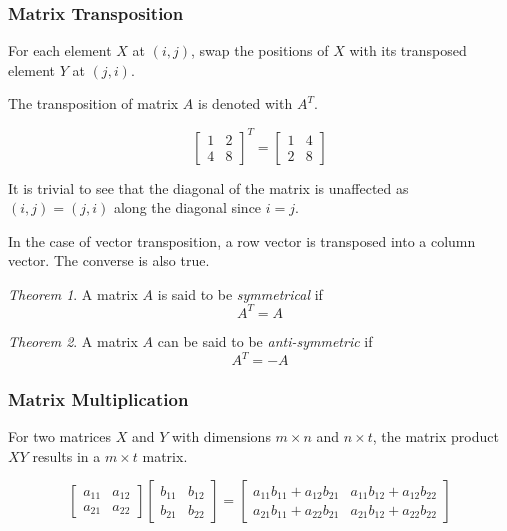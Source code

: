 \documentclass[a4paper]{article}
\theoremstyle{remark}
\theoremstyle{theorem}
\newtheorem{theorem}{Theorem}
\begin{document}
\subsubsection{Matrix Transposition}
For each element $X$ at $(i,j)$, swap the positions of $X$ with its transposed element $Y$ at $(j, i)$.

The transposition of matrix $A$ is denoted with $A^T$.

\begin{equation}
	\begin{bmatrix}
	1	& 2 \\
	4 	& 8
	\end{bmatrix}^{T}
	=
	\begin{bmatrix}
	1	& 4 \\
	2	& 8
	\end{bmatrix}
\end{equation}

It is trivial to see that the diagonal of the matrix is unaffected as $(i,j) = (j,i)$ along the diagonal since $i=j$.

In the case of vector transposition, a row vector is transposed into a column vector.
The converse is also true.

\begin{theorem}
	A matrix $A$ is said to be \emph{symmetrical} if
	\begin{equation}
		A^T = A
	\end{equation}
\end{theorem}

\begin{theorem}
	A matrix $A$ can be said to be \emph{anti-symmetric} if
	\begin{equation}
		A^T = -A
	\end{equation}
\end{theorem}

\subsubsection{Matrix Multiplication}
For two matrices $X$ and $Y$ with dimensions $m\times n$ and $n\times t$, the matrix product $XY$ results in a $m\times t$ matrix.

\begin{equation}
	\begin{bmatrix}
	a_{11} & a_{12} \\
	a_{21} & a_{22}
	\end{bmatrix}
	\begin{bmatrix}
	b_{11} & b_{12} \\
	b_{21} & b_{22}
	\end{bmatrix}
	=
	\begin{bmatrix}
	a_{11}b_{11} + a_{12}b_{21} & a_{11}b_{12} + a_{12}b_{22} \\
	a_{21}b_{11} + a_{22}b_{21} & a_{21}b_{12} + a_{22}b_{22}
	\end{bmatrix}
\end{equation}
\end{document}
